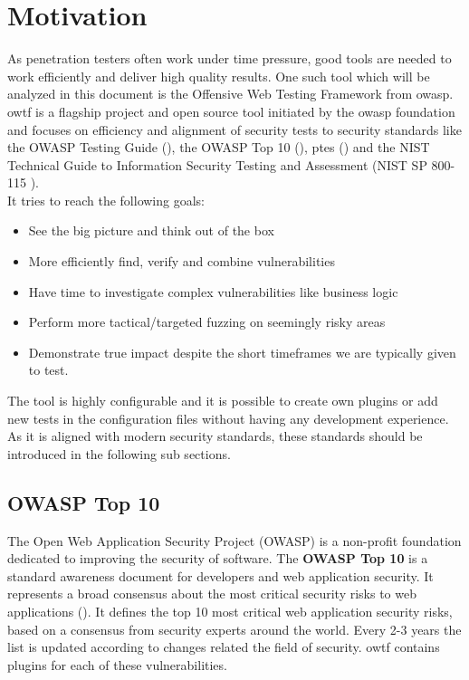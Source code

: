 \section{Motivation}

As penetration testers often work under time pressure, good tools are needed to work efficiently and deliver high quality results. One such tool which will be analyzed in this document is the Offensive Web Testing Framework from \ac{owasp}. \ac{owtf} is a flagship project and open source tool initiated by the \ac{owasp} foundation and focuses on efficiency and alignment of security tests to security standards like the OWASP Testing Guide (\cite{Guide.11.06.2021}), the OWASP Top 10 (\cite{Top10.11.06.2021}), \ac{ptes} (\cite{PTES.11.06.2021}) and the NIST Technical Guide to
Information Security Testing and Assessment (NIST SP 800-115 \cite{NIST.29.06.2021}). \cite{Github.11.06.2021}\\

It tries to reach the following goals:

\begin{itemize}
	\item See the big picture and think out of the box
	\item More efficiently find, verify and combine vulnerabilities
	\item Have time to investigate complex vulnerabilities like business logic
	\item Perform more tactical/targeted fuzzing on seemingly risky areas
	\item Demonstrate true impact despite the short timeframes we are typically given to test.
\end{itemize}

The tool is highly configurable and it is possible to create own plugins or add new tests in the configuration files without having any development experience. As it is aligned with modern security standards, these standards should be introduced in the following sub sections.

\subsection{OWASP Top 10}

The Open Web Application Security Project (OWASP) is a non-profit foundation dedicated to improving the security of software. The \textbf{OWASP Top 10} is a standard awareness document for developers and web application security. It represents a broad consensus about the most critical security risks to web applications (\cite{Top10.11.06.2021}). It defines the top 10 most critical web application security risks, based on a consensus from security experts around the world. Every 2-3 years the list is updated according to changes related the field of security. \ac{owtf} contains plugins for each of these vulnerabilities.

